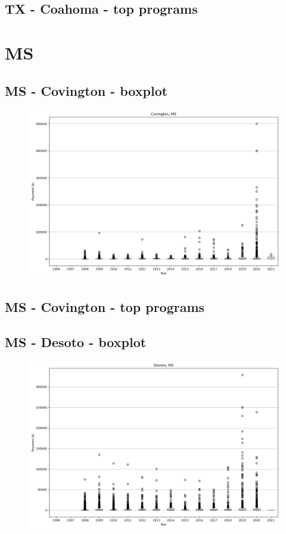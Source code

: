\subsection*{TX - Coahoma - top programs}

\newpage
\section*{MS}
\subsection*{MS - Covington - boxplot}
\begin{figure}[h]
\centering
\includegraphics[width=7in]{../output/boxplots/counties/Covington-MS_boxplot.png}
\end{figure}


\subsection*{MS - Covington - top programs}

\newpage
\subsection*{MS - Desoto - boxplot}
\begin{figure}[h]
\centering
\includegraphics[width=7in]{../output/boxplots/counties/Desoto-MS_boxplot.png}
\end{figure}


